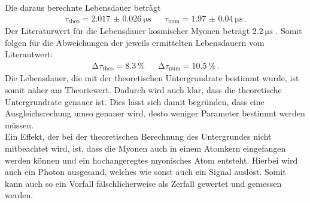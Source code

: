 \noindent
Die daraus berechnte Lebensdauer beträgt
\begin{align*}
    \tau_\text{theo} = \SI{2.017(26)}{\micro\second} && \tau_\text{num} = \SI{1.97(4)}{\micro\second} \, .
\end{align*}
Der Literaturwert für die Lebensdauer kosmischer Myonen beträgt $\SI{2.2}{\micro\second}$ \cite{pdg}.
Somit folgen für die Abweichungen der jeweils ermittelten Lebensdauern vom Literautwert:
\begin{align*}
    \increment \tau_\text{theo} = \SI{8.3}{\percent} && \increment \tau_\text{num} = \SI{10.5}{\percent} \, .
\end{align*}
Die Lebensdauer, die mit der theoretischen Untergrundrate bestimmt wurde, ist somit näher am Theoriewert.
Dadurch wird auch klar, dass die theoretische Untergrundrate genauer ist. Dies lässt sich damit begründen, 
dass eine Ausgleichsrechung umso genauer wird, desto weniger Parameter bestimmt werden müssen. \\
Ein Effekt, der bei der theoretischen Berechnung des Untergrundes nicht mitbeachtet wird, ist, dass die Myonen auch in einem 
Atomkern eingefangen werden können und ein hochangeregtes myonisches Atom entsteht. 
Hierbei wird auch ein Photon ausgesand, welches wie sonst auch ein Signal auslöst. Somit kann auch so ein Vorfall fälschlicherweise als
Zerfall gewertet und gemessen werden. 